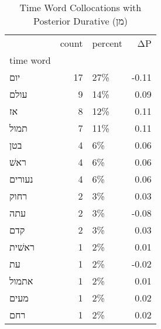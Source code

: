 \begin{table}[htbp!]
\centering
\caption{Time Word Collocations with Posterior Durative (מן)}
\label{table:postdurמן_head_cpd}
\begin{tabular}{lrlr}
\toprule
{} &  count & percent &    ΔP \\
time word &        &         &       \\
\midrule
יום       &     17 &     27\% & -0.11 \\
עולם      &      9 &     14\% &  0.09 \\
אז        &      8 &     12\% &  0.11 \\
תמול      &      7 &     11\% &  0.11 \\
בטן       &      4 &      6\% &  0.06 \\
ראשׁ      &      4 &      6\% &  0.06 \\
נעורים    &      4 &      6\% &  0.06 \\
רחוק      &      2 &      3\% &  0.03 \\
עתה       &      2 &      3\% & -0.08 \\
קדם       &      2 &      3\% &  0.03 \\
ראשׁית    &      1 &      2\% &  0.01 \\
עת        &      1 &      2\% & -0.02 \\
אתמול     &      1 &      2\% &  0.01 \\
מעים      &      1 &      2\% &  0.02 \\
רחם       &      1 &      2\% &  0.02 \\
\bottomrule
\end{tabular}
\end{table}
